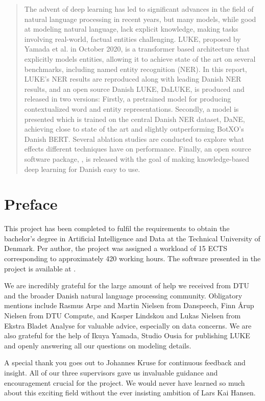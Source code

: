 \documentclass[12pt, fleqn]{report}
\begin{document}
\begin{abstract}
    The advent of deep learning has led to significant advances in the field of natural language processing in recent years, but many models, while good at modeling natural language, lack explicit knowledge, making tasks involving real-world, factual entities challenging.
    LUKE, proposed by Yamada et al. in October 2020, is a transformer based architecture that explicitly models entities, allowing it to achieve state of the art on several benchmarks, including named entity recognition (NER).
    In this report, LUKE's NER results are reproduced along with leading Danish NER results, and an open source Danish LUKE, DaLUKE, is produced and released in two versions:
    Firstly, a pretrained model for producing contextualized word and entity representations.
    Secondly, a model is presented which is trained on the central Danish NER dataset, DaNE, achieving close to state of the art and slightly outperforming BotXO's Danish BERT.
    Several ablation studies are conducted to explore what effects different techniques have on performance.
    Finally, an open source software package, , is released with the goal of making knowledge-based deep learning for Danish easy to use.
\end{abstract}

\chapter*{Preface}
This project has been completed to fulfil the requirements to obtain the bachelor's degree in Artificial Intelligence and Data at the Technical University of Denmark.
Per author, the project was assigned a workload of 15 ECTS corresponding to approximately 420 working hours.
The software presented in the project is available at .

We are incredibly grateful for the large amount of help we received from DTU and the broader Danish natural language processing community.
Obligatory mentions include Rasmus Arpe and Martin Nielsen from Danspeech, Finn Årup Nielsen from DTU Compute, and Kasper Lindskou and Lukas Nielsen from Ekstra Bladet Analyse for valuable advice, especially on data concerns.
We are also grateful for the help of Ikuya Yamada, Studio Ousia for publishing LUKE and openly answering all our questions on modeling details.

A special thank you goes out to Johannes Kruse for continuous feedback and insight.
All of our three supervisors gave us invaluable guidance and encouragement crucial for the project.
We would never have learned so much about this exciting field without the ever insisting ambition of Lars Kai Hansen.
\end{document}
